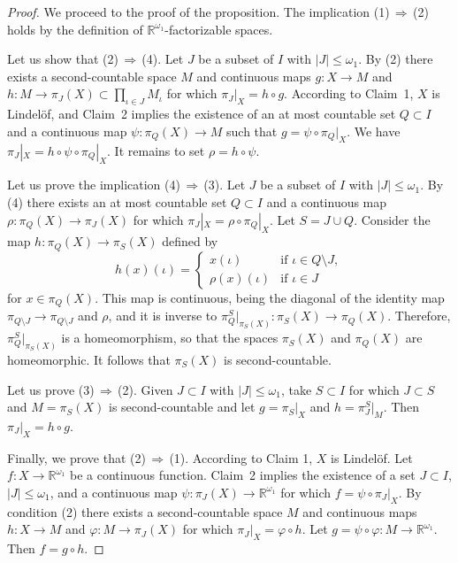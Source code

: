 \documentclass[a4paper,12pt]{amsart}
\theoremstyle{definition}
\theoremstyle{remark}
\begin{document}
\begin{proof}
We proceed to the proof of the proposition. 	       
The implication (1)\,$\Rightarrow$\,(2) holds by the definition of $\mathbb R^{\omega_1}$-factorizable spaces. 

Let us show that (2)\,$\Rightarrow$\,(4). Let $J$ be a subset of $I$ with $|J|\le \omega_1$.
By (2) there exists a second-countable space $M$ and continuous maps $g\colon X\to M$ and 
$h\colon M\to \pi_J(X)\subset \prod_{\iota\in J}M_\iota$ for which $\pi_J|_{X} = h\circ g$.
According to Claim~1, $X$ is Lindel\"of, and Claim~2 implies the existence of an at most countable set 
$Q\subset I$ and a continuous map $\psi\colon \pi_Q(X)\to M$ such that $g=\psi\circ \pi_Q|_{X}$.
We have $\pi_J|_{X} = h\circ \psi\circ \pi_Q|_{X}$. It remains to set $\rho=h\circ \psi$.

Let us prove the implication (4)\,$\Rightarrow\,$(3). Let $J$ be a subset of $I$ with $|J|\le \omega_1$.
By (4) there exists an at most countable set $Q\subset I$ and a continuous map $\rho\colon \pi_Q(X)\to \pi_J(X)$
for which $\pi_J|_X = \rho\circ \pi_Q|_X$.
Let $S=J\cup Q$. Consider the map $h\colon \pi_Q(X)\to \pi_S(X)$ defined by
\[
h(x)(\iota) = \begin{cases}
x(\iota) &\text{if }\iota\in Q\setminus J,
\\
\rho(x)(\iota) &\text{if }\iota\in J
\end{cases}
\]
for $x\in \pi_Q(X)$.
This map is continuous, being the diagonal of the identity map $\pi_{Q\setminus J}\to \pi_{Q\setminus J}$ 
and $\rho$, and it is inverse to $\pi^S_Q|_{\pi_S(X)}\colon \pi_S(X)\to \pi_Q(X)$. Therefore, 
$\pi^S_Q|_{\pi_S(X)}$ is a homeomorphism, so that the spaces $\pi_S(X)$ and $\pi_Q(X)$ are homeomorphic. 
It follows that $\pi_S(X)$ is second-countable.

Let us prove (3)\,$\Rightarrow$\,(2). Given $J\subset I$ with $|J|\le\omega_1$, 
take  $S\subset I$ for which $J\subset S$ and $M=\pi_S(X)$ is second-countable and 
let $g=\pi_S|_X$ and $h=\pi^S_J|_M$. Then $\pi_J|_{X} = h\circ g$.

Finally, we prove that (2)\,$\Rightarrow$\,(1). 
According to Claim 1, $X$ is Lindel\"of.
Let $f\colon X\to \mathbb R^{\omega_1}$ be a continuous function.
Claim~2 implies the existence of a set $J\subset I$, $|J|\leq \omega_1$, and a continuous map 
$\psi\colon \pi_J(X)\to \mathbb R^{\omega_1}$ for which $f=\psi\circ \pi_J|_X$.
By condition (2) 
there exists a second-countable space 
$M$ and continuous maps $h\colon X\to M$ and $\varphi\colon M\to \pi_J(X)$ 
for which $\pi_J|_{X} = \varphi\circ h$. 
Let $g=\psi\circ \varphi \colon M\to \mathbb R^{\omega_1}$.
Then $f = g\circ h$.
\end{proof}
\end{document}
